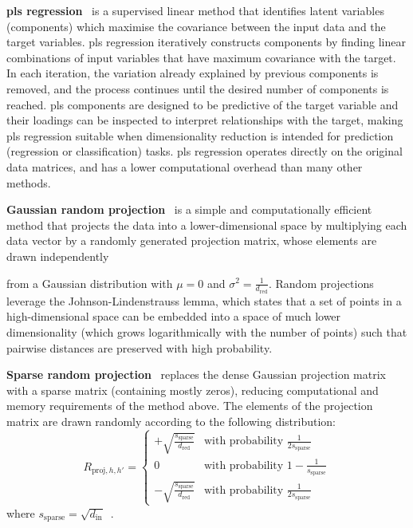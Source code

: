      \noindent \textbf{\Gls{pls} regression}~\citep{WolEtAl01}
    is a supervised linear method that identifies latent variables (components) which maximise the covariance between the input data and the target variables.  \gls{pls} regression
    iteratively constructs components by finding linear combinations of input variables that have maximum covariance with the target. In each iteration, the variation already explained by previous components is removed, and the process continues until the desired number of components is reached. \gls{pls} components are designed to be predictive of the target variable and their loadings can be inspected to interpret relationships with the target, making \gls{pls} regression suitable when dimensionality reduction is intended for prediction (regression or classification) tasks. \gls{pls} regression operates directly on the original data matrices, and has a lower computational overhead than many other methods.

    \noindent \textbf{Gaussian random projection}~\citep{Achlioptas01} is a simple and computationally efficient method that projects the data into a lower-dimensional space by multiplying each data vector by a randomly generated projection matrix, whose elements are drawn independently

    from a Gaussian distribution with $\mu=0$ and $\sigma^2=\frac{1}{d_{\mathrm{red}}}$. Random projections leverage the Johnson-Lindenstrauss lemma,
    which states that a set of points in a high-dimensional space can be embedded into a space of much lower dimensionality (which grows logarithmically with the number of points) such that pairwise distances are preserved with high probability.

    \noindent \textbf{Sparse random projection}~\citep{Achlioptas01} replaces the dense Gaussian projection matrix with a sparse matrix (containing mostly zeros), reducing computational and memory requirements of the method above. The elements of the projection matrix are drawn randomly according to the following distribution:
    \begin{equation*}
        R_{\mathrm{proj},h,h\prime}= \begin{cases}
            + \sqrt{\frac{s_{\mathrm{sparse}}}{d_{\mathrm{red}}}} & \text{with probability } \frac{1}{2s_{\mathrm{sparse}}}\\
            0           & \text{with probability } 1 - \frac{1}{s_{\mathrm{sparse}}}\\
            - \sqrt{\frac{s_{\mathrm{sparse}}}{d_{\mathrm{red}}}} & \text{with probability } \frac{1}{2s_{\mathrm{sparse}}}
        \end{cases}
    \end{equation*}
    where $s_{\mathrm{sparse}}=\sqrt{d_{\mathrm{in}}}$~\citep{LiEtAl06}.

